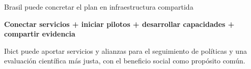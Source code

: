\documentclass[aspectratio=169,11pt]{beamer}
\begin{document}
\begin{frame}{Brasil puede concretar el plan en infraestructura compartida}
  \vspace{0.25cm}
  \begin{center}
  \end{center}
  \vspace{0.35cm}
  \begin{center}
    \Large\color{Navy}\textbf{Conectar servicios + iniciar pilotos + desarrollar capacidades + compartir evidencia}
  \end{center}
  \vspace{0.25cm}
  \begin{center}
    \normalsize\color{Muted}Ibict puede aportar servicios y alianzas para el seguimiento de políticas y una evaluación científica más justa, con el beneficio social como propósito común.
  \end{center}
  \vfill
\end{frame}
\end{document}
